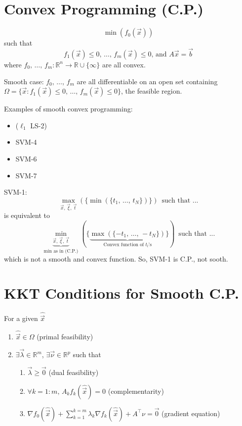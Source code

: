 \documentclass{article}
\newcommand{\R}{\mathbb{R}}
\begin{document}
\section{Convex Programming (C.P.)}

\[
    \min\left(f_0(\vec{x})\right)
\]
such that
\[
    f_1(\vec{x}) \leq 0,\, \ldots,\, f_m(\vec{x}) \leq 0,\, \text{and } A\vec{x} = \vec{b}
\]
where $f_0,\, \ldots,\, f_m \colon \R^n \to \R \cup \{\infty\}$ are all convex.

Smooth case: $f_0,\, \ldots,\, f_m$ are all differentiable on an open set containing $\Omega = \{\vec{x} : f_1(\vec{x}) \leq 0,\, \ldots,\, f_m(\vec{x}) \leq 0\}$, the feasible region.

Examples of smooth convex programming:
\begin{itemize}
    \item ($\ell_1$ LS-2)
    \item SVM-4
    \item SVM-6
    \item SVM-7
\end{itemize}

SVM-1:
\[
    \max_{\vec{x},\, \vec{\xi},\, \vec{t}}\left(\{\min(\{t_1,\, \ldots,\, t_N\})\}\right)\, \text{ such that ...}
\]
is equivalent to
\[
    \underbrace{\min_{\vec{x},\, \vec{\xi},\, \vec{t}}}_{\text{min as in (C.P.)}}\left(\{\underbrace{\max(\{-t_1,\, \ldots,\, -t_N\})}_{\text{Convex function of } t_l \text{'s}}\}\right)\, \text{ such that ...}
\]
which is not a smooth and convex function. So, SVM-1 is C.P., not sooth.

\section{KKT Conditions for Smooth C.P.}
For a given $\hat{\vec{x}}$
\begin{enumerate}
    \item $\hat{\vec{x}} \in \Omega$ (primal feasibility)
    \item $\exists \vec{\lambda} \in \R^m$, $\exists \vec{\nu} \in \R^p$ such that
    \begin{enumerate}
        \item $\vec{\lambda} \geq \vec{0}$ (dual feasibility)
        \item $\forall k = 1:m,\, A_kf_k\left(\hat{\vec{x}}\right) = 0$ (complementarity)
        \item $\nabla f_0\left(\hat{\vec{x}}\right) + \sum_{k = 1}^{k = m} \lambda_k \nabla f_k\left(\hat{\vec{x}}\right) + A^\top\nu = \vec{0}$ (gradient equation)
    \end{enumerate}
\end{enumerate}
\end{document}
